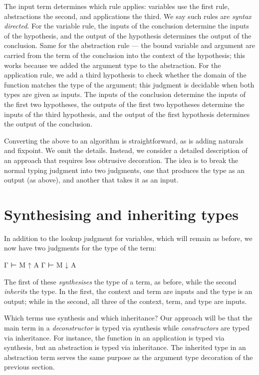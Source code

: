 The input term determines which rule applies: variables use the first
rule, abstractions the second, and applications the third. We say such
rules are \emph{syntax directed}. For the variable rule, the inputs of
the conclusion determine the inputs of the hypothesis, and the output of
the hypothesis determines the output of the conclusion. Same for the
abstraction rule --- the bound variable and argument are carried from
the term of the conclusion into the context of the hypothesis; this
works because we added the argument type to the abstraction. For the
application rule, we add a third hypothesis to check whether the domain
of the function matches the type of the argument; this judgment is
decidable when both types are given as inputs. The inputs of the
conclusion determine the inputs of the first two hypotheses, the outputs
of the first two hypotheses determine the inputs of the third
hypothesis, and the output of the first hypothesis determines the output
of the conclusion.

Converting the above to an algorithm is straightforward, as is adding
naturals and fixpoint. We omit the details. Instead, we consider a
detailed description of an approach that requires less obtrusive
decoration. The idea is to break the normal typing judgment into two
judgments, one that produces the type as an output (as above), and
another that takes it as an input.

\hypertarget{synthesising-and-inheriting-types}{%
\section{Synthesising and inheriting
types}\label{synthesising-and-inheriting-types}}

In addition to the lookup judgment for variables, which will remain as
before, we now have two judgments for the type of the term:

\begin{myDisplay}
Γ ⊢ M ↑ A
Γ ⊢ M ↓ A
\end{myDisplay}

The first of these \emph{synthesises} the type of a term, as before,
while the second \emph{inherits} the type. In the first, the context and
term are inputs and the type is an output; while in the second, all
three of the context, term, and type are inputs.

Which terms use synthesis and which inheritance? Our approach will be
that the main term in a \emph{deconstructor} is typed via synthesis
while \emph{constructors} are typed via inheritance. For instance, the
function in an application is typed via synthesis, but an abstraction is
typed via inheritance. The inherited type in an abstraction term serves
the same purpose as the argument type decoration of the previous
section.

